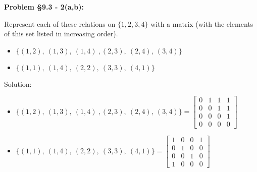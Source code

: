 \documentclass{article}
\newenvironment{problem}[1]
{\begin{mdframed}[default]
\textbf{Problem #1:}
}
{\end{mdframed}
}
\begin{document}
\begin{problem}{\S 9.3 - 2(a,b)}
Represent each of these relations on $\{ 1, 2, 3, 4 \}$ with a matrix (with the
elements of this set listed in increasing order).
\begin{itemize}
\item[(a)] $\{ (1,2),~(1,3),~(1,4)~,(2,3),~(2,4),~(3,4) \}$
\item[(b)] $\{ (1,1),~(1,4),~(2,2),~(3,3),~(4,1) \}$
\end{itemize}

Solution:

\begin{itemize}
    \item[(a)] $\{ (1,2),~(1,3),~(1,4)~,(2,3),~(2,4),~(3,4) \}=\begin{bmatrix} 0&1&1&1 \\ 0&0&1&1 \\ 0&0&0&1 \\ 0&0&0&0 \end{bmatrix}$
    \item[(b)] $\{ (1,1),~(1,4),~(2,2),~(3,3),~(4,1) \}=\begin{bmatrix} 1&0&0&1 \\ 0&1&0&0 \\ 0&0&1&0 \\ 1&0&0&0 \end{bmatrix}$
    \end{itemize}
\end{problem}
\end{document}
